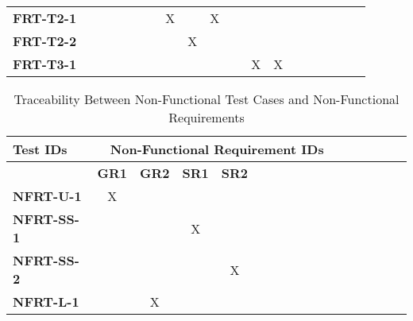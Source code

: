 \documentclass[12pt, titlepage]{article}
\begin{document}
\begin{landscape}
\begin{longtable}{|l|cccccccccccccccc|}
            \textbf{FRT-T2-1}  & ~                                                         & ~            & ~            & ~            & X            & ~            & X            & ~            & ~            & ~             \\
            \textbf{FRT-T2-2}  & ~                                                         & ~            & ~            & ~            & ~            & X            & ~            & ~            & ~            & ~             \\
            \textbf{FRT-T3-1}  & ~                                                         & ~            & ~            & ~            & ~            & ~            & ~            & ~            & X            & X             \\     
			\hline
		\end{longtable}

		\begin{longtable}{|l|cccccccccccccccc|}
			\caption{Traceability Between Non-Functional Test Cases and Non-Functional Requirements}                                                                                                                                                                                                                           \\
			\hline
			\textbf{Test IDs}   & \multicolumn{11}{c|}{\textbf{Non-Functional Requirement IDs}}                                                                                                                                                                                                                                         \\
			\hline
			~                   & \textbf{GR1}                                              & \textbf{GR2} & \textbf{SR1} & \textbf{SR2} \\
			\hline
			\textbf{NFRT-U-1}  & X                                                         & ~            & ~            & ~             \\
			\textbf{NFRT-SS-1}  & ~                                                         & ~            & X            & ~            \\
			\textbf{NFRT-SS-2}  & ~                                                         & ~            & ~            & X            \\
			\textbf{NFRT-L-1}  & ~                                                         & X            & ~            & ~             \\
			\hline
		\end{longtable}
\end{landscape}
		
\end{document}
